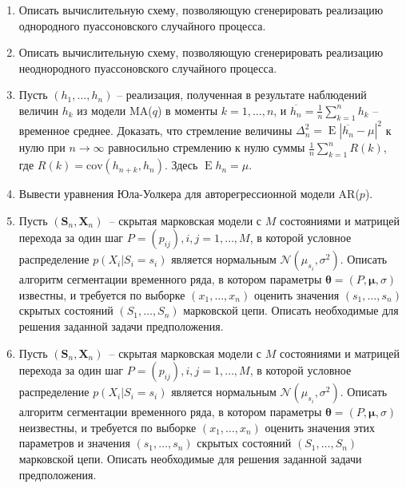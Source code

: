 \documentclass[a4paper,12pt]{extreport}
\renewcommand{\=}[1]{\stackrel{#1}{=}} %
\newcommand{\Expect}{\mathop{{}\mathrm{E}}}
\begin{document}
\begin{enumerate}
	\item Описать вычислительную схему, позволяющую
	сгенерировать реализацию однородного пуассоновского случайного процесса.

	\item Описать вычислительную схему, позволяющую
	сгенерировать реализацию неоднородного пуассоновского случайного процесса.

	\item Пусть $(h_1, \ldots, h_n)$ -- реализация, полученная 
	в результате наблюдений величин $h_k$ из модели MA($q$)
	в моменты $k=1, \ldots, n$, и $\overline{h_n} = \frac 1 n \sum\limits_{k=1} ^n h_k$ --
	временное среднее. 
	Доказать, что стремление величины $\Delta_n^2 = \Expect |\overline{h_n} - \mu|^2$ к нулю 
	при $n \to \infty$ равносильно стремлению к нулю суммы $\frac 1 n \sum\limits_{k=1} ^n R(k)$,
	где $R(k) = \mathrm{cov}(h_{n + k}, h_n)$. Здесь $\Expect h_n = \mu$.


	\item Вывести уравнения Юла-Уолкера для авторегрессионной модели AR($p$).

	\item Пусть $(\bm{S}_n, \bm{X}_n)$~--
	скрытая марковская модели с $M$ состояниями и матрицей
	перехода за один шаг $P = (p_{ij}), i, j = 1, \ldots, M$,
	в которой условное распределение $p(X_i | S_i = s_i)$ является
	нормальным $\mathcal{N}(\mu_{s_i}, \sigma^2)$.
	Описать алгоритм сегментации временного ряда, в котором 
	параметры $\bm{\theta} = (P, \bm{\mu}, \sigma)$ известны,
	и требуется по выборке $(x_1, \ldots, x_n)$ 
	оценить значения $(s_1, \ldots, s_n)$ скрытых состояний
	$(S_1, \ldots, S_n)$  марковской цепи. Описать необходимые
	для решения заданной задачи предположения.

	\item Пусть $(\bm{S}_n, \bm{X}_n)$~--
	скрытая марковская модели с $M$ состояниями и матрицей
	перехода за один шаг $P = (p_{ij}), i, j = 1, \ldots, M$,
	в которой условное распределение $p(X_i | S_i = s_i)$ является
	нормальным $\mathcal{N}(\mu_{s_i}, \sigma^2)$.
	Описать алгоритм сегментации временного ряда, в котором 
	параметры $\bm{\theta} = (P, \bm{\mu}, \sigma)$ неизвестны,
	и требуется по выборке $(x_1, \ldots, x_n)$ 
	оценить значения этих параметров
	и значения $(s_1, \ldots, s_n)$ скрытых состояний
	$(S_1, \ldots, S_n)$ марковской цепи. Описать необходимые
	для решения заданной задачи предположения.

\end{enumerate}
\end{document}
